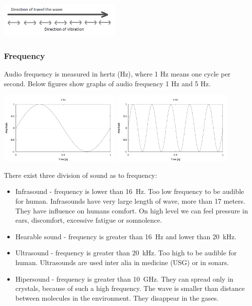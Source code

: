 \documentclass[11pt,titlepage]{article}
\theoremstyle{plain}
\begin{document}
\begin{center}
		\includegraphics[width=0.45\textwidth]{img/longitudinal_wave}
\end{center}
\subsubsection{Frequency}
Audio frequency is measured in hertz (Hz), where 1 Hz means one cycle per second. Below figures show graphs of audio frequency 1 Hz and 5 Hz.


\begin{center}
	\includegraphics[width=0.45\textwidth]{img/frequency_1Hz}
	\includegraphics[width=0.45\textwidth]{img/frequency_5Hz}
\end{center}

There exist three division of sound as to frequency:
\begin{itemize}
	\item Infrasound - frequency is lower than 16~Hz. Too low frequency to be audible for human. Infrasounds have very large length of wave, more than 17 meters. They have influence on humans comfort. On high level we can feel pressure in ears, discomfort, excessive fatigue or somnolence.
	\item Hearable sound - frequency is greater than 16~Hz and lower than 20~kHz.
	\item Ultrasound - frequency is greater than 20~kHz. Too high to be audible for human. Ultrasounds are used inter alia in medicine (USG) or in sonars. 
	\item Hipersound - frequency is greater than 10~GHz. They can spread only in crystals, because of such a high frequency. The wave is smaller than distance between molecules in the environment. They disappear in the gases.
\end{itemize}
\end{document}
